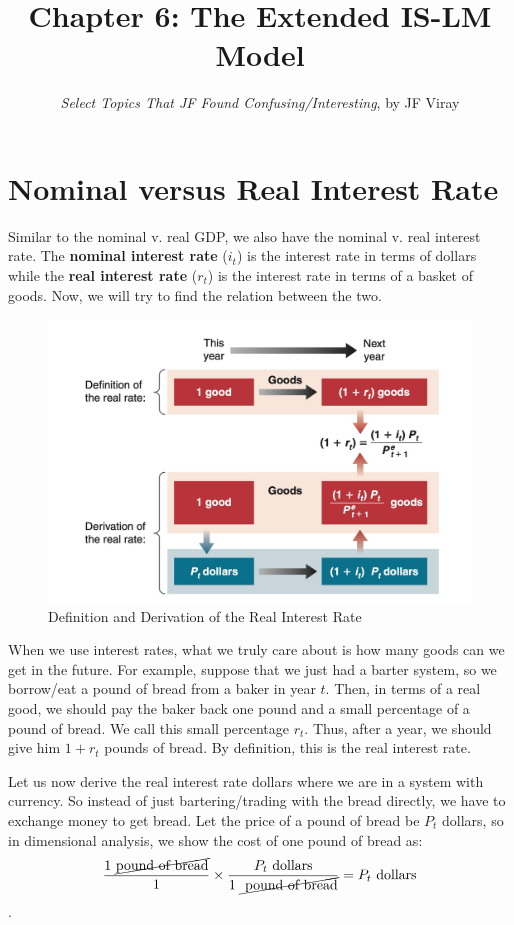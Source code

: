 \documentclass{extarticle}
\title{\vspace{-2em}Chapter 6: The Extended IS-LM Model}
\author{\emph{Select Topics That JF Found Confusing/Interesting}, by JF Viray}
\date{}
\begin{document}
\maketitle



\section{Nominal versus Real Interest Rate}
Similar to the nominal v. real GDP, we also have the nominal v. real interest rate. The \textbf{nominal interest rate} ($i_t$) is the interest rate in terms of dollars while the \textbf{real interest rate} ($r_t$) is the interest rate in terms of a basket of goods. Now, we will try to find the relation between the two.

\begin{figure}[h]
    \centering 
    \includegraphics[width=0.5\linewidth]{derivation.png} 
    \caption{Definition and Derivation of the Real Interest Rate} 
    \label{fig:derivation} 
\end{figure}

When we use interest rates, what we truly care about is how many goods can we get in the future. For example, suppose that we just had a barter system, so we borrow/eat a pound of bread from a baker in year $t$. Then, in terms of a real good, we should pay the baker back one pound and a small percentage of a pound of bread. We call this small percentage $r_t$. Thus, after a year, we should give him $1 + r_t$ pounds of bread. By definition, this is the real interest rate.  

Let us now derive the real interest rate  dollars where we are in a system with currency. So instead of just bartering/trading with the bread directly, we have to exchange money to get bread. Let the price of a pound of bread be $P_t$ dollars, so in dimensional analysis, we show the cost of one pound of bread as:
$$\frac{1 \text{ } \cancel{\text{pound of bread}}}{1} \times \frac{P_t \text{ dollars}}{1 \text{ }\cancel{\text{ pound of bread}}} = P_t \text{ dollars}$$. 
\end{document}
